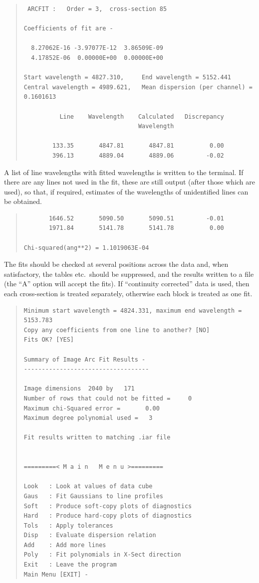 \begin{quote}\begin{verbatim}
 ARCFIT :   Order = 3,  cross-section 85
 
Coefficients of fit are -

  8.27062E-16 -3.97077E-12  3.86509E-09
  4.17852E-06  0.00000E+00  0.00000E+00

Start wavelength = 4827.310,     End wavelength = 5152.441
Central wavelength = 4989.621,   Mean dispersion (per channel) = 0.1601613

          Line    Wavelength    Calculated   Discrepancy
                                Wavelength

        133.35       4847.81       4847.81          0.00
        396.13       4889.04       4889.06         -0.02
\end{verbatim}\end{quote}

A list of line wavelengths with fitted wavelengths is written to
the terminal. If there are any lines not used in the fit, these are
still output (after those which are used), so that, if required,
estimates of the wavelengths of unidentified lines can be obtained.

\begin{quote}\begin{verbatim}
       1646.52       5090.50       5090.51         -0.01
       1971.84       5141.78       5141.78          0.00

Chi-squared(ang**2) = 1.1019063E-04
\end{verbatim}\end{quote}

The fits should be checked at several positions across the data and,
when satisfactory, the tables etc.\ should be suppressed, and the
results written to a file (the ``A'' option will accept the fits).
If ``continuity corrected'' data is used, then each cross-section is
treated separately, otherwise each block is treated as one fit.

\begin{quote}\begin{verbatim}
Minimum start wavelength = 4824.331, maximum end wavelength = 5153.783
Copy any coefficients from one line to another? [NO]
Fits OK? [YES]
 
Summary of Image Arc Fit Results -
-----------------------------------
 
Image dimensions  2040 by   171
Number of rows that could not be fitted =     0
Maximum chi-Squared error =       0.00
Maximum degree polynomial used =   3
 
Fit results written to matching .iar file
 
 
=========< M a i n   M e n u >=========
 
Look   : Look at values of data cube
Gaus   : Fit Gaussians to line profiles
Soft   : Produce soft-copy plots of diagnostics
Hard   : Produce hard-copy plots of diagnostics
Tols   : Apply tolerances
Disp   : Evaluate dispersion relation
Add    : Add more lines
Poly   : Fit polynomials in X-Sect direction
Exit   : Leave the program
Main Menu [EXIT] -
\end{verbatim}\end{quote}

